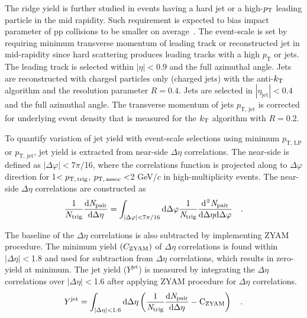 The ridge yield is further studied in events having a hard jet or a high-$p_\mathrm{T}$ leading particle in the mid rapidity. Such requirement is expected to bias impact parameter of pp collisions to be smaller on average~\cite{Sjostrand:1986ep,Frankfurt:2010ea}.
The event-scale is set by requiring minimum transverse momentum of leading track or reconstructed jet in mid-rapidity since hard scattering produces leading tracks with a high $p_\mathrm{T}$ or jets. The leading track is selected within $|\eta|<0.9$ and the full azimuthal angle. Jets are reconstructed with charged particles only (charged jets) with the anti-$k_{\rm{T}}$ algorithm and the resolution parameter $R = 0.4$. Jets are selected in $|\eta_\mathrm{jet}|<0.4$ and the full azimuthal angle. The transverse momentum of jets $p_\mathrm{T,\,jet}$ is corrected for underlying event density that is measured for the $k_{\rm{T}}$ algorithm with $R = 0.2$. 

To quantify variation of jet yield with event-scale selections using minimum $p_\mathrm{T,\,LP}$ or $p_\mathrm{T,\,jet}$, jet yield is extracted from near-side $\Delta\eta$ correlations. The near-side is defined as $|\Delta\varphi|<$7$\pi$/16, where the correlations function is projected along to $\Delta\varphi$ direction for 1$<p_\mathrm{T,\,trig}$, $p_\mathrm{T,\,assoc}<$2 GeV/$c$ in high-multiplicity events. The near-side $\Delta\eta$ correlations are constructed as
\begin{eqnarray}
\frac{1}{N_{\rm{trig}}} \frac{ \rm{d}\it{}N_{\rm{pair}} }{ \rm{d}\Delta\eta } = \int_{|\Delta \varphi|<7\pi/16} \rm{d} \Delta \varphi \frac{1}{\it{N}_{\rm{trig}}} \frac{ \rm{d}\it{}^{2} N_{\rm{pair}} }{ \rm{d}\Delta\eta d\Delta\varphi} \quad.
\end{eqnarray}

The baseline of the $\Delta\eta$ correlations is also subtracted by implementing ZYAM procedure. The minimum yield $(C_{\rm{ZYAM}})$ of $\Delta\eta$ correlations is found within $|\Delta\eta|<$1.8 and used for subtraction from  $\Delta\eta$ correlations, which results in zero-yield at minimum. The jet yield ($Y^{\mathrm{jet}}$) is measured by integrating the $\Delta\eta$ correlations over $|\Delta\eta|<$1.6 after applying ZYAM procedure for $\Delta\eta$ correlations.
\begin{eqnarray}
Y^{\rm{jet}} = \int_{|\Delta \eta|<1.6} \rm{d} \Delta\eta \left( \frac{1}{\it{N}_{\rm{trig}}} \frac{ \rm{d}\it{}N_{\rm{pair}} }{ \rm{d}\Delta\eta } - C_{\rm{ZYAM}} \right)\quad.
\end{eqnarray}

